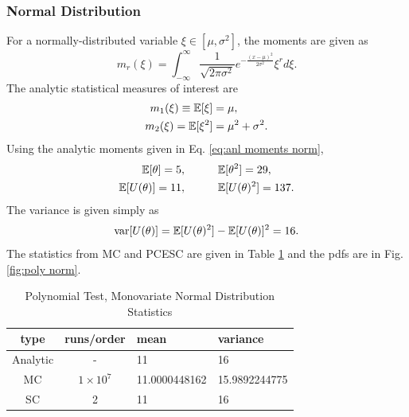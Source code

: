 \subsubsection{Normal Distribution}
For a normally-distributed variable $\xi\in[\mu,\sigma^2]$, the moments are given as
\begin{equation}
m_r(\xi)=\int_{-\infty}^\infty \frac{1}{\sqrt{2\pi\sigma^2}}e^{-\frac{(x-\mu)^2}{2\sigma^2}}\xi^r d\xi.
\end{equation}
The analytic statistical measures of interest are
\begin{align}\label{eq:anl moments norm}
m_1(\xi)\equiv\mathbb{E}[ \xi]&=\mu,\\
m_2(\xi)=\mathbb{E}[ \xi^2]&=\mu^2+\sigma^2.
\end{align}
Using the analytic moments given in Eq. \ref{eq:anl moments norm},
\begin{align}
\mathbb{E}[ \theta] = 5, &\hspace{30pt}\mathbb{E}[ \theta^2]=29,\\
\mathbb{E}[ U(\theta)]=11, &\hspace{30pt}\mathbb{E}[ U(\theta)^2]=137.
\end{align}
The variance is given simply as
\begin{equation}
\text{var}[U(\theta)]=\mathbb{E}[ U(\theta)^2]-\mathbb{E}[ U(\theta)]^2=16.
\end{equation}
The statistics from MC and PCESC are given in Table \ref{tab:poly normal} and the pdfs are in Fig. \ref{fig:poly norm}.

\begin{table}[H]
\begin{center}
\begin{tabular}{c c|l l}
type & runs/order & mean & variance \\ \hline
Analytic & - & 11 & 16 \\
MC & $1\times10^7$ & 11.0000448162 & 15.9892244775 \\
SC & 2 & 11 & 16 \\
\end{tabular}
\end{center}
\caption{Polynomial Test, Monovariate Normal Distribution Statistics}
\label{tab:poly normal}
\end{table}

